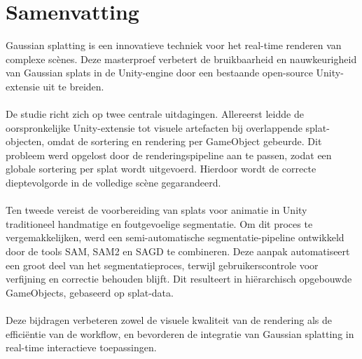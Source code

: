 \documentclass[12pt]{article}
\begin{document}

\newpage
{}
\section*{Samenvatting}
Gaussian splatting is een innovatieve techniek voor het real-time renderen van complexe scènes. Deze masterproef verbetert de bruikbaarheid en nauwkeurigheid van Gaussian splats in de Unity-engine door een bestaande open-source Unity-extensie uit te breiden.
\\\\
De studie richt zich op twee centrale uitdagingen. Allereerst leidde de oorspronkelijke Unity-extensie tot visuele artefacten bij overlappende \linebreak splat-objecten, omdat de sortering en rendering per GameObject gebeurde. Dit probleem werd opgelost door de renderingspipeline aan te passen, zodat een globale sortering per splat wordt uitgevoerd. Hierdoor wordt de correcte dieptevolgorde in de volledige scène gegarandeerd.
\\\\
Ten tweede vereist de voorbereiding van splats voor animatie in Unity traditioneel handmatige en foutgevoelige segmentatie. Om dit proces te vergemakkelijken, werd een semi-automatische segmentatie-pipeline ontwikkeld door de tools SAM, SAM2 en SAGD te combineren. Deze aanpak automatiseert een groot deel van het segmentatieproces, terwijl gebruikerscontrole voor verfijning en correctie behouden blijft. Dit resulteert in hiërarchisch opgebouwde GameObjects, gebaseerd op splat-data.
\\\\
Deze bijdragen verbeteren zowel de visuele kwaliteit van de rendering als de efficiëntie van de workflow, en bevorderen de integratie van Gaussian splatting in real-time interactieve toepassingen.
\newpage
{}
\end{document}

